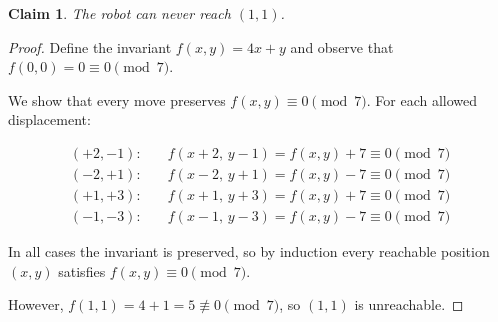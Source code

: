 \documentclass{article}
\newtheorem*{claim}{Claim}
\begin{document}
\begin{claim}
    The robot can never reach $(1,1)$.
\end{claim}

\begin{proof}
    Define the invariant $f(x,y) = 4x + y$ and observe that $f(0,0) = 0 \equiv 0 \pmod{7}$.

    \medskip
    We show that every move preserves $f(x,y) \equiv 0 \pmod 7$. For each allowed displacement:

    \[
    \begin{aligned}
    (+2,-1):\quad & f(x+2,\, y-1) = f(x,y) + 7 \equiv 0 \pmod{7} \\
    (-2,+1):\quad & f(x-2,\, y+1) = f(x,y) - 7 \equiv 0 \pmod{7} \\
    (+1,+3):\quad & f(x+1,\, y+3) = f(x,y) + 7 \equiv 0 \pmod{7} \\
    (-1,-3):\quad & f(x-1,\, y-3) = f(x,y) - 7 \equiv 0 \pmod{7}
    \end{aligned}
    \]

    In all cases the invariant is preserved, so by induction every reachable
    position $(x,y)$ satisfies $f(x,y) \equiv 0 \pmod{7}$.

    \medskip
    However, $f(1,1) = 4 + 1 = 5 \not\equiv 0 \pmod{7}$,
    so $(1,1)$ is unreachable.
\end{proof}
\end{document}
